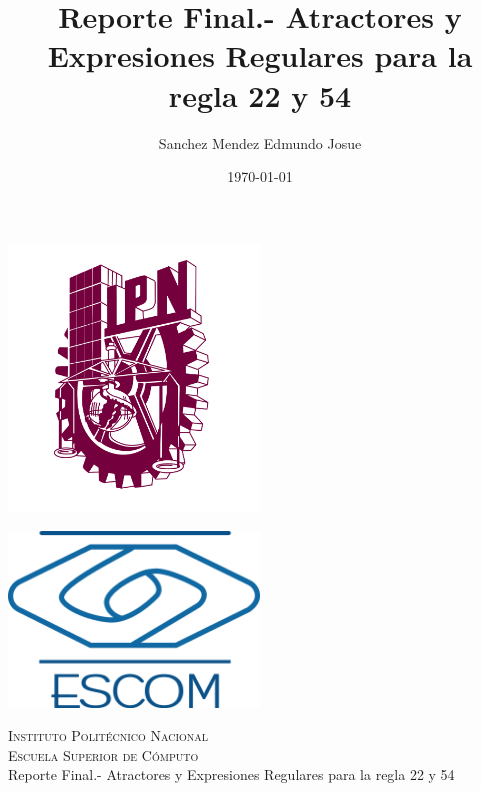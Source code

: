 \documentclass[11pt]{article}
\date{\today}
\title{Reporte Final.- Atractores y Expresiones Regulares para la regla 22 y 54}
\author{Sanchez Mendez Edmundo Josue}
\begin{document}
		\begin{titlepage}
			\begin{center}
				
				
				\noindent
				\begin{minipage}{0.5\textwidth}
					\begin{flushleft} \large
						\includegraphics[width=0.5\textwidth]{resources/ipn.png}
					\end{flushleft}
				\end{minipage}%
				\begin{minipage}{0.55\textwidth}
					\begin{flushright} \large
						\includegraphics[width=0.5\textwidth]{resources/escom.png}
					\end{flushright}
				\end{minipage}
				
				\textsc{\LARGE Instituto Politécnico Nacional}\\[0.5cm]
				
				\textsc{\Large Escuela Superior de Cómputo}\\[1cm]
				
				
				{ \huge Reporte Final.- Atractores y Expresiones Regulares para la regla 22 y 54  \\[1cm] }
				

\end{center}
\end{titlepage}
\end{document}
